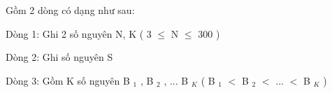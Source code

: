 Gồm 2 dòng có dạng như sau:

Dòng 1: Ghi 2 số nguyên N, K ( 3  $\le$  N  $\le$  300 )

Dòng 2: Ghi số nguyên S

Dòng 3: Gồm K số nguyên B $_ 1 $ , B $_ 2 $ , ... B $_ K $ ( B $_ 1 $ $<$ B $_ 2 $ $<$ ... $<$ B $_ K $ )